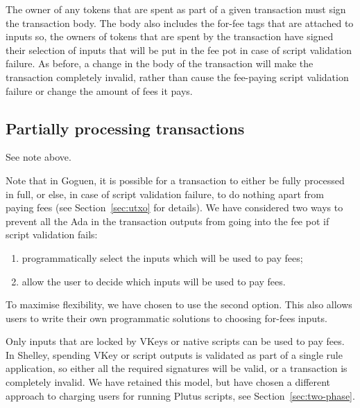 The owner of any tokens that are spent as part of a given transaction
must sign the transaction body. The body also includes the for-fee tags that are attached to inputs so,
the owners of tokens that are spent by the transaction have
signed their selection of inputs that will be put in the fee pot in case of script validation failure.
As before, a change in the body of the transaction
will make the transaction completely invalid, rather than cause the fee-paying script validation
failure or change the amount of fees it pays.

\subsection{Partially processing transactions}
\begin{note}
  See note above.
\end{note}
Note that in Goguen, it is possible for a transaction
to either be fully processed in full, or else, in case of script validation failure,
to do nothing apart from paying fees (see Section~\ref{sec:utxo} for details).
We have considered two ways to prevent all the Ada in the transaction outputs from going into
the fee pot if script validation fails:
%
\begin{enumerate}
  \item programmatically select the inputs which will be used to pay fees;
  \item allow the user to decide which inputs will be used to pay fees.
\end{enumerate}
%
To maximise flexibility, we have chosen to use the second option.
This also allows users to write their own programmatic solutions to choosing for-fees inputs.

Only inputs that are locked by VKeys or native scripts can
be used to pay fees. In Shelley, spending VKey or script outputs is
validated as part of a single rule application, so either all
the required signatures will be valid, or a transaction is completely
invalid. We have retained this model, but have chosen a different approach to
charging users for running Plutus scripts, see
Section~\ref{sec:two-phase}.
